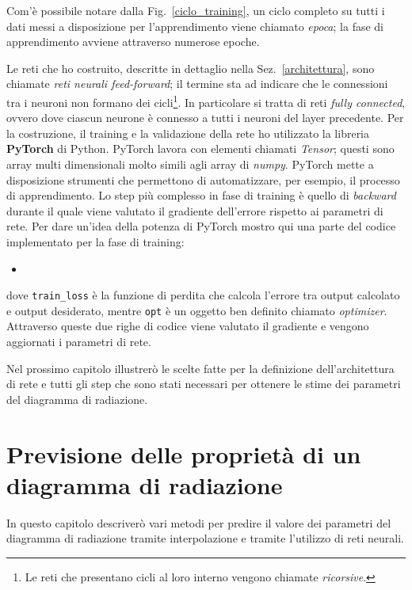 \documentclass[12pt,a4paper,final]{book}
\newcommand{\insertcode}[2]{\begin{itemize}\item[]\end{itemize}} %
\begin{document}
Com'è possibile notare dalla Fig.~\ref{ciclo_training}, un ciclo completo su tutti i dati messi a disposizione per l'apprendimento viene chiamato \textit{epoca}; la fase di apprendimento avviene attraverso numerose epoche.


Le reti che ho costruito, descritte in dettaglio nella Sez.~\ref{architettura}, sono chiamate \textit{reti neurali feed-forward}; il termine sta ad indicare che le connessioni tra i neuroni non formano dei cicli\footnote{Le reti che presentano cicli al loro interno vengono chiamate \textit{ricorsive}.}. In particolare si tratta di reti \textit{fully connected}, ovvero dove ciascun neurone è connesso a tutti i neuroni del layer precedente.
Per la costruzione, il training e la validazione della rete ho utilizzato la libreria \textbf{PyTorch} di Python. 
PyTorch lavora con elementi chiamati \textit{Tensor}; questi sono array multi dimensionali molto simili agli array di \textit{numpy}. PyTorch mette a disposizione strumenti che permettono di automatizzare, per esempio, il processo di apprendimento. Lo step più complesso in fase di training è quello di \textit{backward} durante il quale viene valutato il gradiente dell'errore rispetto ai parametri di rete. Per dare un'idea della potenza di PyTorch mostro qui una parte del codice implementato per la fase di training:
\insertcode{../scripts/opt.py}{}\label{opt}
dove \texttt{train\_loss} \`e la funzione di perdita che calcola l'errore tra output calcolato e output desiderato, mentre \texttt{opt} \`e un oggetto ben definito chiamato \textit{optimizer}.
Attraverso queste due righe di codice viene valutato il gradiente e vengono aggiornati i parametri di rete.


Nel prossimo capitolo illustrerò le scelte fatte per la definizione dell'architettura di rete e tutti gli step che sono stati necessari per ottenere le stime dei parametri del diagramma di radiazione.




\chapter{Previsione delle proprietà di un diagramma di radiazione}\label{prev_param}
In questo capitolo descriverò vari metodi per predire il valore dei parametri del diagramma di radiazione tramite interpolazione e tramite l'utilizzo di reti neurali. 
\end{document}
